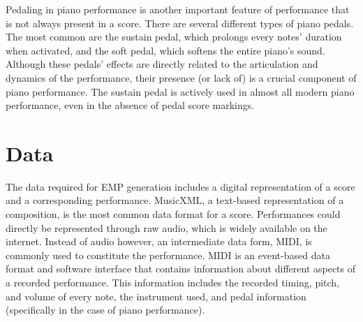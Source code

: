Pedaling in piano performance is another important feature of performance that is not always present in a score. There are several different types of piano pedals. The most common are the sustain pedal, which prolongs every notes' duration when activated, and the soft pedal, which softens the entire piano's sound. Although these pedals' effects are directly related to the articulation and dynamics of the performance, their presence (or lack of) is a crucial component of piano performance. The sustain pedal is actively used in almost all modern piano performance, even in the absence of pedal score markings. 


\section{Data}
The data required for EMP generation includes a digital representation of a score and a corresponding performance. MusicXML, a text-based representation of a composition, is the most common data format for a score. Performances could directly be represented through raw audio, which is widely available on the internet. Instead of audio however, an intermediate data form, MIDI, is commonly used to constitute the performance. MIDI is an event-based data format and software interface that contains information about different aspects of a recorded performance. This information includes the recorded timing, pitch, and volume of every note, the instrument used, and pedal information (specifically in the case of piano performance). 

